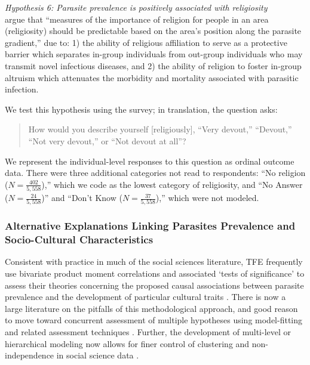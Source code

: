 \documentclass[12pt]{article}
\begin{document}
\noindent\textit{Hypothesis 6: Parasite prevalence is positively associated with religiosity}\\

\citet[pg67]{Fincher2012} argue that ``measures of the importance of religion for people in an area (religiosity) should be predictable based on the area's position along the parasite gradient,'' due to: 1) the ability of religious affiliation to serve as a protective barrier which separates in-group individuals from out-group individuals who may transmit novel infectious diseases, and 2) the ability of religion to foster in-group altruism which attenuates the morbidity and mortality associated with parasitic infection. 

We test this hypothesis using the \citet{LB2008} survey; in translation, the question asks:
\begin{quote}
\small
How would you describe yourself [religiously], ``Very devout,'' ``Devout,'' ``Not very devout,'' or ``Not devout at all''?
 \end{quote}
We represent the individual-level responses to this question as ordinal outcome data. There were three additional categories not read to respondents: ``No religion ($N=\frac{402}{5,558}$),'' which we code as the lowest category of religiosity, and ``No Answer ($N=\frac{24}{5,558}$)'' and ``Don't Know ($N=\frac{37}{5,558}$),'' which were not modeled. 

\subsubsection{Alternative Explanations Linking Parasites Prevalence and Socio-Cultural Characteristics}
	Consistent with practice in much of the social sciences literature, TFE frequently use bivariate product moment correlations and associated `tests of significance' to assess their theories concerning the proposed causal associations between parasite prevalence and the development of particular cultural traits \citep[see, for example,][]{Thornhill2009}.  There is now a large literature on the pitfalls of this methodological approach, and good reason to move toward concurrent assessment of multiple hypotheses using model-fitting and related assessment techniques \citep{towner2007alternative, gelman2013bayesian, Gelman2013}.   Further, the development of multi-level or hierarchical modeling now allows for finer control of clustering and non-independence in social science data \citep{gelman2006data}.  
	
\end{document}
